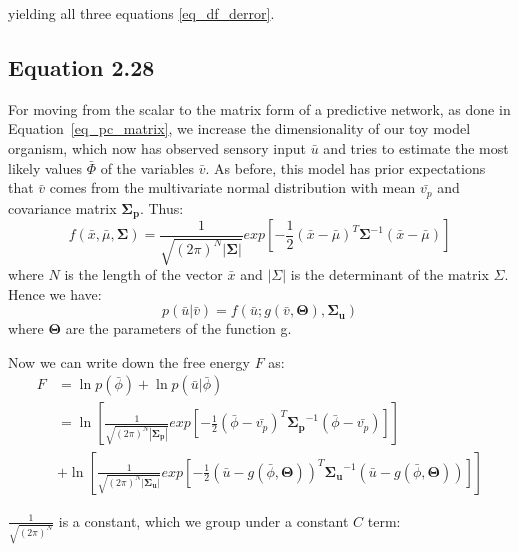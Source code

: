 yielding all three equations \ref{eq_df_derror}.

\newpage 
\subsection{Equation 2.28}
For moving from the scalar to the matrix form of a predictive network, as done in Equation~\ref{eq_pc_matrix}, we increase the dimensionality of our toy model organism, which now has observed sensory input $\bar{u}$ and tries to estimate the most likely values $\bar{\Phi}$ of the variables $\bar{v}$. As before, this model has prior expectations that $\bar{v}$ comes from the multivariate normal distribution with mean $\bar{v_p}$ and covariance matrix $\mathbf{\Sigma_p}$. Thus:
$$
f(\bar{x}, \bar{\mu}, \boldsymbol{\Sigma}) = 
\frac{1}{\sqrt{(2\pi)^N|\boldsymbol{\Sigma}|}}
exp \left[ -\frac{1}{2} (\bar{x} - \bar{\mu})^T \boldsymbol{\Sigma}^{-1}  (\bar{x} - \bar{\mu}) \right]
$$
where $N$ is the length of the vector $\bar{x}$ and $|\Sigma|$ is the determinant of the matrix $\Sigma$. Hence we have:
$$
p(\bar{u} | \bar{v}) = f(\bar{u}; g(\bar{v}, \boldsymbol{\Theta}), \boldsymbol{\Sigma_u})
$$
where $\mathbf{\Theta}$ are the parameters of the function g.

Now we can write down the free energy $F$ as:
\begin{equation*}
    \begin{aligned}
        F &= \ln p(\bar{\phi}) + \ln p(\bar{u} | \bar{\phi}) \\
        &= \ln 
\left[
\frac{1}{\sqrt{(2\pi)^N|\boldsymbol{\Sigma_p}|}}
exp \left[ -\frac{1}{2} (\bar{\phi} - \bar{v_p})^T \boldsymbol{\Sigma_p}^{-1}  (\bar{\phi} - \bar{v_p}) \right]
\right] \\
&+
\ln 
\left[ 
\frac{1}{\sqrt{(2\pi)^N|\boldsymbol{\Sigma_u}|}}
exp \left[ -\frac{1}{2} (\bar{u} - g(\bar{\phi}, \boldsymbol{\Theta}))^T \boldsymbol{\Sigma_u}^{-1}  (\bar{u} - g(\bar{\phi}, \boldsymbol{\Theta})) \right]
\right]
    \end{aligned}
\end{equation*}

$\frac{1}{\sqrt{(2\pi)^N}}$ is a constant, which we group under a constant $C$ term:

